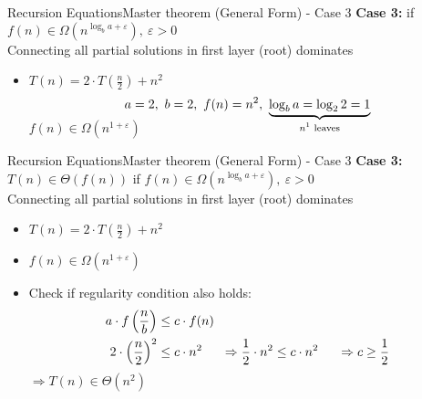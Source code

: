 \begin{frame}{Recursion Equations}{Master theorem (General Form) - Case 3}
  \textbf{Case 3:}
  \hfill if {\color{MainA}
    $f(n) \in \Omega(n^{\log_b a+\varepsilon}), ~ \varepsilon > 0$
  }\\
  {\color{gray}Connecting all partial solutions in first layer (root) dominates}
  \vspace{1.0em}
  \begin{itemize}
    \item<3->
      $T(n) = 2 \cdot T(\tfrac{n}{2}) + n^2$
      \vspace{-0.5em}
      \begin{displaymath}
        a = 2, ~ b = 2, ~ f(n) = n^2, ~
        \smash{\underbrace{
          \log_b a = \log_2 2 = 1
        }_{\text{$n^1$ leaves}}}
      \end{displaymath}
      {\color{MainA}$f(n) \in \Omega(n^{1+\varepsilon})$}
  \end{itemize}
\end{frame}



\begin{frame}{Recursion Equations}{Master theorem (General Form) - Case 3}
  \textbf{Case 3:}
  {\color{MainB}$T(n) \in \Theta(f(n))$}
  \hfill if {\color{MainA}
    $f(n) \in \Omega(n^{\log_b a+\varepsilon}), ~ \varepsilon > 0$
  }\\
  {\color{gray}Connecting all partial solutions in first layer (root) dominates}
  \vspace{1.0em}
  \begin{itemize}
    \item
      $T(n) = 2 \cdot T(\tfrac{n}{2}) + n^2$
    \item<3->
      {\color{MainA}$f(n) \in \Omega(n^{1+\varepsilon})$}
    \item<4->
      Check if {\color{MainA}regularity condition} also holds:\\
      \begin{align*}
        a \cdot f\left(\frac{n}{b}\right) &\leq c \cdot f(n)\\
        2 \cdot \left(\frac{n}{2}\right)^2 &\leq c \cdot n^2
        \hspace{1.5em} \Rightarrow \frac{1}{2} \cdot n^2 \leq c \cdot n^2
        \hspace{1.5em} \Rightarrow c \geq \frac{1}{2}
      \end{align*}
      {\color{MainA}$\Rightarrow T(n) \in \Theta(n^2)$}
  \end{itemize}
\end{frame}

